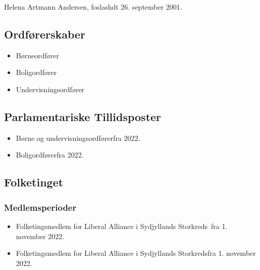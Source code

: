 \documentclass[11pt, a4paper]{awesome-cv}
\begin{document}
\makecvheader[R]
\makelettertitle
\begin{cvletter}
Helena Artmann Andersen, foslashdt 26. september 2001.

\subsection*{Ordførerskaber}
\begin{itemize}
\item Børneordfører
\item Boligordfører
\item Undervisningsordfører
\end{itemize}
\subsection*{Parlamentariske Tillidsposter}
\begin{itemize}
\item Børne og undervisningsordførerfra 2022.
\item Boligordførerfra 2022.
\end{itemize}
\subsection*{Folketinget}
\subsubsection*{Medlemsperioder}
\begin{itemize}
\item Folketingsmedlem for Liberal Alliance i Sydjyllands Storkreds fra 1. november 2022.
\item Folketingsmedlem for Liberal Alliance i Sydjyllands Storkredsfra 1. november 2022.
\end{itemize}
\end{cvletter}
\end{document}
